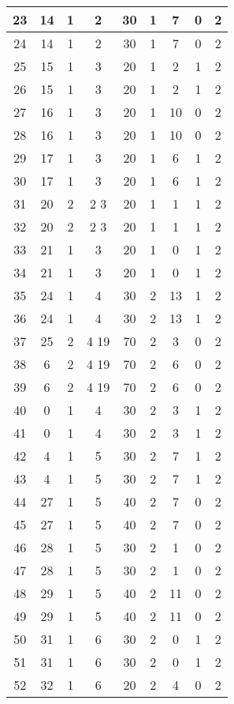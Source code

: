 \begin{apendices}
{\begin{longtable}{|c|c|c|c|c|c|c|c|c|}
23 & 14 & 1 & 2 & 30 & 1 & 7 & 0 & 2 \\ \hline
24 & 14 & 1 & 2 & 30 & 1 & 7 & 0 & 2 \\ \hline
25 & 15 & 1 & 3 & 20 & 1 & 2 & 1 & 2 \\ \hline
26 & 15 & 1 & 3 & 20 & 1 & 2 & 1 & 2 \\ \hline
27 & 16 & 1 & 3 & 20 & 1 & 10 & 0 & 2 \\ \hline
28 & 16 & 1 & 3 & 20 & 1 & 10 & 0 & 2 \\ \hline
29 & 17 & 1 & 3 & 20 & 1 & 6 & 1 & 2 \\ \hline
30 & 17 & 1 & 3 & 20 & 1 & 6 & 1 & 2 \\ \hline
31 & 20 & 2 & 2 3 & 20 & 1 & 1 & 1 & 2 \\ \hline
32 & 20 & 2 & 2 3 & 20 & 1 & 1 & 1 & 2 \\ \hline
33 & 21 & 1 & 3 & 20 & 1 & 0 & 1 & 2 \\ \hline
34 & 21 & 1 & 3 & 20 & 1 & 0 & 1 & 2 \\ \hline
35 & 24 & 1 & 4 & 30 & 2 & 13 & 1 & 2 \\ \hline
36 & 24 & 1 & 4 & 30 & 2 & 13 & 1 & 2 \\ \hline
37 & 25 & 2 & 4 19 & 70 & 2 & 3 & 0 & 2 \\ \hline
38 & 6 & 2 & 4 19 & 70 & 2 & 6 & 0 & 2 \\ \hline
39 & 6 & 2 & 4 19 & 70 & 2 & 6 & 0 & 2 \\ \hline
40 & 0 & 1 & 4 & 30 & 2 & 3 & 1 & 2 \\ \hline
41 & 0 & 1 & 4 & 30 & 2 & 3 & 1 & 2 \\ \hline
42 & 4 & 1 & 5 & 30 & 2 & 7 & 1 & 2 \\ \hline
43 & 4 & 1 & 5 & 30 & 2 & 7 & 1 & 2 \\ \hline
44 & 27 & 1 & 5 & 40 & 2 & 7 & 0 & 2 \\ \hline
45 & 27 & 1 & 5 & 40 & 2 & 7 & 0 & 2 \\ \hline
46 & 28 & 1 & 5 & 30 & 2 & 1 & 0 & 2 \\ \hline
47 & 28 & 1 & 5 & 30 & 2 & 1 & 0 & 2 \\ \hline
48 & 29 & 1 & 5 & 40 & 2 & 11 & 0 & 2 \\ \hline
49 & 29 & 1 & 5 & 40 & 2 & 11 & 0 & 2 \\ \hline
50 & 31 & 1 & 6 & 30 & 2 & 0 & 1 & 2 \\ \hline
51 & 31 & 1 & 6 & 30 & 2 & 0 & 1 & 2 \\ \hline
52 & 32 & 1 & 6 & 20 & 2 & 4 & 0 & 2 \\ \hline

\end{longtable}}
\end{apendices}

